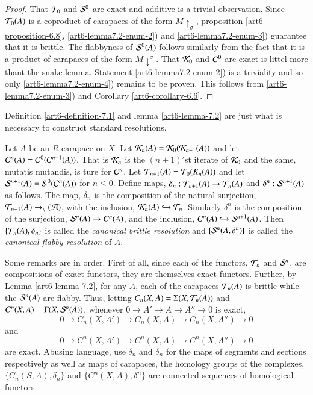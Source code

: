 \begin{proof}
That $\mathcal{T}_{0}$ and $\mathcal{S}^{0}$ are exact and additive is a trivial observation. Since $\mathcal{T}_{0}(A)$ is a coproduct of carapaces of the form $M\uparrow_{\sigma}$, proposition \ref{art6-proposition-6.8}, \ref{art6-lemma7.2-enum-2}) and \ref{art6-lemma7.2-enum-3}) guarantee that it is brittle. The flabbyness of $\mathcal{S}^{0}(A)$ follows similarly from the fact that it is a product of carapaces of the form $M\downarrow^{\sigma}$. That $\mathcal{K}_{0}$ and $\mathcal{C}^{0}$ are exact is littel more thant the snake lemma. Statement \ref{art6-lemma7.2-enum-2}) is a triviality and so only
\ref{art6-lemma7.2-enum-4})  remains to be proven. This follows from \ref{art6-lemma7.2-enum-3}) and Corollary
\ref{art6-corollary-6.6}.  
\end{proof}

Definition \ref{art6-definition-7.1} and lemma \ref{art6-lemma-7.2} are just what is necessary to construct standard resolutions.

\begin{definition}\label{art6-definition-7.3}
Let $A$ be an $R$-carapace on $X$. Let $\mathcal{K}_{n}(A) = \mathcal{K}_{0}(\mathcal{K}_{n-1}(A))$ and let $\mathcal{C}^{n}(A) = \mathcal{C}^{0}(\mathcal{C}^{n-1}(A))$. That is $\mathcal{K}_{n}$ is the $(n+1)'$st iterate of $\mathcal{K}_{0}$ and the same, mutatis mutandis, is ture for $\mathcal{C}^{n}$. Let $\mathcal{T}_{n+1}(A) = \mathcal{T}_{0}(K_{n}(A))$ and let $\mathcal{S}^{n+1}(A) = S^{0}(\mathcal{C}^{n}(A))$ for $n\leq 0$. Define maps, $\delta_{n} : \mathcal{T}_{n+1}(A) \rightarrow \mathcal{T}_{n}(A)$ and $\delta^{n} : \mathcal{S}^{n+1}(A)$ as follows. The map, $\delta_{n}$ is the composition of the natural surjection, $\mathcal{T}_{n+1}(A)\rightarrow \cal_{n}(A)$, with the inclusion, $\mathcal{K}_{n}(A) \hookrightarrow \mathcal{T}_{n}$. Similarly $\delta^{n}$ is the composition of the surjection, $\mathcal{S}^{n}(A) \rightarrow C^{n}(A)$, and the inclusion, $\mathcal{C}^{n}(A) \hookrightarrow \mathcal{S}^{n+1}(A)$. Then $\{\mathcal{T}_{n}(A), \delta_{n}\}$ is called the \textit{canonical brittle resolution} and $\{\mathcal{S}^{n}(A, \delta^{n})\}$ is called the \textit{canonical flabby resolution} of $A$.  

Some remarks are in order. First of all, since each of the functors, $\mathcal{T}_{n}$ and $\mathcal{S}^{n}$, are compositions of exact functors, they are themselves exact functors. Further, by Lemma \ref{art6-lemma-7.2}, for any $A$, each of the carapaces $\mathcal{T}_{n}(A)$ is brittle while the $\mathcal{S}^{n}(A)$ are flabby. Thus, letting $C_{n}(X, A) = \Sigma(X, \mathcal{T}_{n}(A))$ and $C^{n}(X, A)= \Gamma(X, \mathcal{S}^{n}(A))$, whenever $0 \rightarrow A' \rightarrow A \rightarrow A'' \rightarrow 0$ is exact,
$$
0 \rightarrow C_{n}(X, A') \rightarrow C_{n}(X, A)\rightarrow C_{n}(X, A'')\rightarrow 0
$$
and
$$
0 \rightarrow C^{n}(X, A') \rightarrow C^{n}(X, A) \rightarrow C^{n}(X, A'')\rightarrow 0
$$
are exact. Abusing language, use $\delta_{n}$  and $\delta_{n}$ for the maps of segments and sections respectively as well as maps of carapaces, the homology groups of the complexes, $\{C_{n}(S, A), \delta_{n}\}$ and $\{C^{n}(X, A), \delta^{n}\}$ are connected sequences of homological functors. 
\end{definition}

